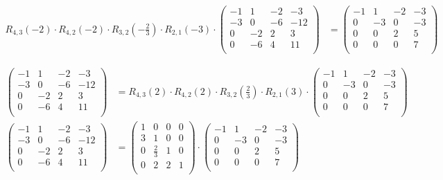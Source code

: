 \documentclass{article}
\begin{document}
\begin{align*}
    R_{4,3}(-2) \cdot R_{4,2}(-2) \cdot R_{3,2}\left(-\frac{2}{3}\right) \cdot R_{2,1}(-3) \cdot \begin{pmatrix}
        -1 & 1 & -2 & -3 \\
        -3 & 0 & -6 & -12 \\
        0 & -2 & 2 & 3 \\
        0 & -6 & 4 & 11 \\
    \end{pmatrix} &= \begin{pmatrix}
        -1 & 1 & -2 & -3 \\
        0 & -3 & 0 & -3 \\
        0 & 0 & 2 & 5 \\
        0 & 0 & 0 & 7 \\
    \end{pmatrix}
\end{align*}

\begin{align*}
    \begin{pmatrix}
        -1 & 1 & -2 & -3 \\
        -3 & 0 & -6 & -12 \\
        0 & -2 & 2 & 3 \\
        0 & -6 & 4 & 11 \\
    \end{pmatrix}
    &=
    R_{4,3}(2) \cdot 
    R_{4,2}(2) \cdot 
    R_{3,2}\left(\frac{2}{3}\right) \cdot 
    R_{2,1}(3) \cdot
    \begin{pmatrix}
        -1 & 1 & -2 & -3 \\
        0 & -3 & 0 & -3 \\
        0 & 0 & 2 & 5 \\
        0 & 0 & 0 & 7 \\
    \end{pmatrix} \\
    \begin{pmatrix}
        -1 & 1 & -2 & -3 \\
        -3 & 0 & -6 & -12 \\
        0 & -2 & 2 & 3 \\
        0 & -6 & 4 & 11 \\
    \end{pmatrix}
    &=
    \begin{pmatrix}
        1 & 0 & 0 & 0 \\
        3 & 1 & 0 & 0 \\
        0 & \frac{2}{3} & 1 & 0 \\
        0 & 2 & 2 & 1 \\
    \end{pmatrix} \cdot \begin{pmatrix}
        -1 & 1 & -2 & -3 \\
        0 & -3 & 0 & -3 \\
        0 & 0 & 2 & 5 \\
        0 & 0 & 0 & 7 \\
    \end{pmatrix}
\end{align*}
\end{document}
